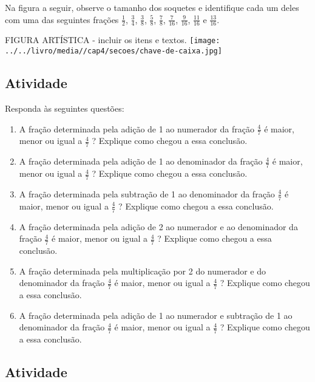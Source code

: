 \documentclass[a4,12pt]{book}
\begin{document}
Na figura a seguir, observe o tamanho dos soquetes e identifique cada um deles com uma das seguintes frações $\frac{1}{2}$, $\frac{3}{4}$, $\frac{3}{8}$, $\frac{5}{8}$, $\frac{7}{8}$, $\frac{7}{16}$, $\frac{9}{16}$, $\frac{11}{16}$ e $\frac{13}{16}$.
\begin{imagem*}[breakable]{}{}   FIGURA ARTÍSTICA - incluir os itens e textos.  
    \texttt{[image: ../../livro/media//cap4/secoes/chave-de-caixa.jpg]}  
\end{imagem*}

\subsection{Atividade}

Responda às seguintes questões: 

\begin{enumerate} [\quad a)] %
  \item     A fração determinada pela adição de 1 ao numerador da fração     $\frac{4}{7}$     é maior, menor ou igual a     $\frac{4}{7}$    ? Explique como chegou a essa conclusão.
  \item     A fração determinada pela adição de 1 ao denominador da fração     $\frac{4}{7}$     é maior, menor ou igual a     $\frac{4}{7}$    ? Explique como chegou a essa conclusão.
  \item     A fração determinada pela subtração de 1 ao denominador da fração     $\frac{4}{7}$     é maior, menor ou igual a     $\frac{4}{7}$    ? Explique como chegou a essa conclusão.
  \item     A fração determinada pela adição de 2 ao numerador e ao denominador da fração     $\frac{4}{7}$     é maior, menor ou igual a     $\frac{4}{7}$    ? Explique como chegou a essa conclusão.
  \item     A fração determinada pela multiplicação por 2 do numerador e do denominador da fração     $\frac{4}{7}$     é maior, menor ou igual a     $\frac{4}{7}$    ? Explique como chegou a essa conclusão.
  \item     A fração determinada pela adição de 1 ao numerador e subtração de 1 ao denominador da fração     $\frac{4}{7}$     é maior, menor ou igual a     $\frac{4}{7}$    ? Explique como chegou a essa conclusão.
\end{enumerate} %

\subsection{Atividade}
\end{document}
